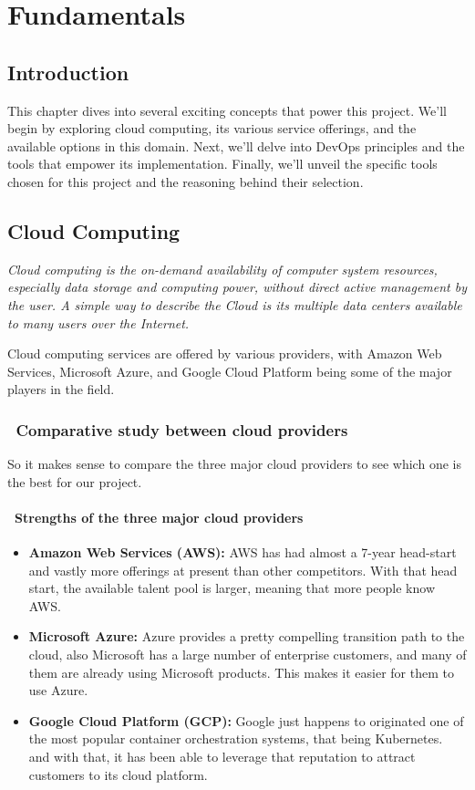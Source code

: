 \chapter{Fundamentals}
\section{Introduction}
This chapter dives into several exciting concepts that power this project. We'll begin by exploring cloud computing, its various service offerings, and the available options in this domain. Next, we'll delve into DevOps principles and the tools that empower its implementation. Finally, we'll unveil the specific tools chosen for this project and the reasoning behind their selection.

\section{Cloud Computing}
\emph{Cloud computing is the on-demand availability of computer system resources, especially data storage and computing power, without direct active management by the user. A simple way to describe the Cloud is its multiple data centers available to many users over the Internet.} \cite{webArticle3}
\par
\noindent
Cloud computing services are offered by various providers, with Amazon Web Services, Microsoft Azure, and Google Cloud Platform being some of the major players in the field.
\subsection*{ \textbullet\ Comparative study between cloud providers}
So it makes sense to compare the three major cloud providers to see which one is the best for our project.
\subsubsection*{ \textbullet\ Strengths of the three major cloud providers \cite{webArticle1}}
\begin{itemize}
    \item \textbf{Amazon Web Services (AWS):} AWS has had almost a 7-year head-start and vastly more offerings at present than other competitors. With that head start, the available talent pool is larger, meaning that more people know AWS.
    \item \textbf{Microsoft Azure:} Azure provides a pretty compelling transition path to the cloud, also Microsoft has a large number of enterprise customers, and many of them are already using Microsoft products. This makes it easier for them to use Azure.
    \item \textbf{Google Cloud Platform (GCP):} Google just happens to originated one of the most popular container orchestration systems, that being Kubernetes. and with that, it has been able to leverage that reputation to attract customers to its cloud platform.
\end{itemize}
